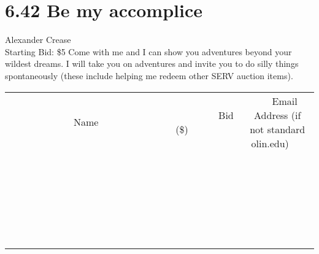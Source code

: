 \documentclass[11pt]{article}
\begin{document}
\section*{6.42 Be my accomplice}
Alexander Crease
\\
Starting Bid: \$5
\newline
Come with me and I can show you adventures beyond your wildest dreams. I will take you on adventures and invite you to do silly things spontaneously (these include helping me redeem other SERV auction items).
\\[6ex]
\begin{tabular}{c c c}
~~~~~~~~~~~~~Name~~~~~~~~~~~~~ & ~~~~~~~~~Bid (\$)~~~~~~~~~  & ~~~Email Address (if not standard olin.edu)~~~\\
 & & \\
\hline
 & & \\
\hline
 & & \\
\hline
 & & \\
\hline
 & & \\
\hline
 & & \\
\hline
 & & \\
\hline
 & & \\
\hline
 & & \\
\hline
 & & \\
\hline
 & & \\
\hline
 & & \\
\hline
 & & \\
\hline
 & & \\
\hline
 & & \\
\hline
 & & \\
\hline
 & & \\
\hline
 & & \\
\hline
 & & \\
\hline
 & & \\
\hline
 & & \\
\hline
 & & \\
\hline
 & & \\
\hline
 & & \\
\hline
 & & \\
\hline
 & & \\
\hline
\end{tabular}
\newpage
\end{document}
